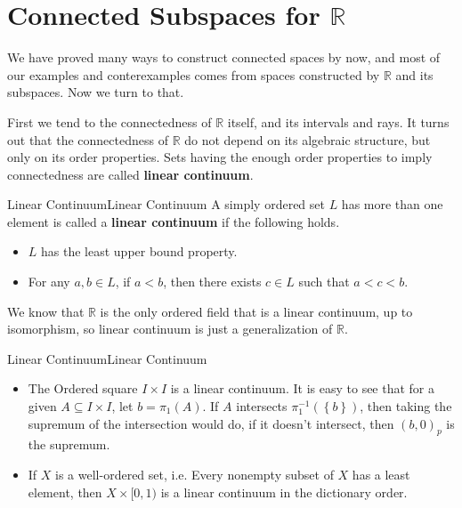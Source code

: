 \documentclass[../main.tex]{subfiles}
\begin{document}
\section{Connected Subspaces for $\mathbb{R}$}

We have proved many ways to construct connected spaces by now, and most of our examples and conterexamples comes from spaces constructed by $\mathbb{R}$ and its subspaces. Now we turn to that.

First we tend to the connectedness of $\mathbb{R}$ itself, and its intervals and rays. It turns out that the connectedness of $\mathbb{R}$ do not depend on its algebraic structure, but only on its order properties. Sets having the enough order properties to imply connectedness are called \textbf{linear continuum}.

\begin{definition}{Linear Continuum}{Linear Continuum}
A simply ordered set $L$ has more than one element is called a \textbf{linear continuum} if the following holds.
\begin{itemize}
\item $L$ has the least upper bound property.
\item For any $a,b\in L$, if $a < b$, then there exists $c\in L$ such that $a < c < b$.
	\end{itemize}
\end{definition}

We know that $\mathbb{R}$ is the only ordered field that is a linear continuum, up to isomorphism, so linear continuum is just a generalization of $\mathbb{R}$.

\begin{example}{Linear Continuum}{Linear Continuum}
\begin{itemize}
\item The Ordered square $I \times I$ is a linear continuum. It is easy to see that for a given $A \subseteq I \times I$, let $b = \pi_1(A)$. If $A$ intersects $\pi_1^{-1}(\left\{ b \right\})$, then taking the supremum of the intersection would do, if it doesn't intersect, then $(b,0)_p$ is the supremum.
\item If $X$ is a well-ordered set, i.e. Every nonempty subset of $X$ has a least element, then $X \times [0,1)$ is a linear continuum in the dictionary order.
\end{itemize}
\end{example}
\end{document}
